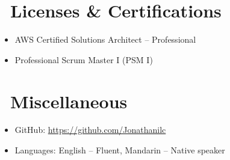 \documentclass{resume}
\begin{document}
\section{\faHeartO\ Licenses \& Certifications}
\begin{itemize}[parsep=0.5ex]
  \item AWS Certified Solutions Architect – Professional
  \item Professional Scrum Master I (PSM I)
\end{itemize}


\section{\faInfo\ Miscellaneous}
\begin{itemize}[parsep=0.5ex]
  \item GitHub: \url{https://github.com/Jonathanilc}
  \item Languages: English – Fluent, Mandarin – Native speaker
\end{itemize}

%
%
\end{document}
